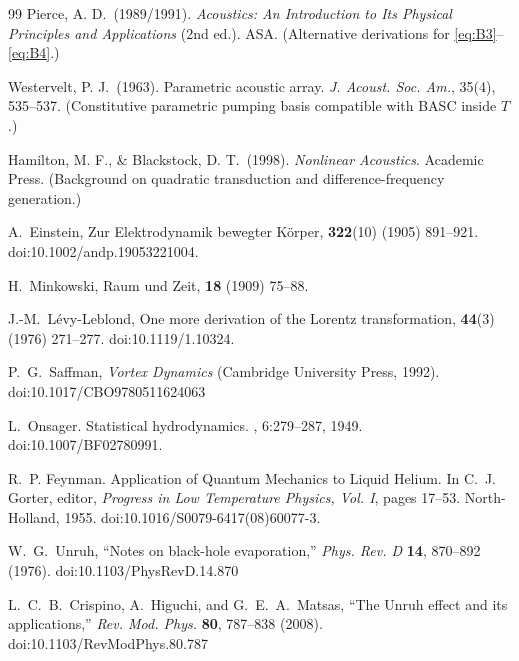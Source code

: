 \documentclass[10pt,reprint,aps,onecolumn,nofootinbib]{revtex4-2}
\begin{document}
\begin{thebibliography}{99}
    Pierce, A. D.\ (1989/1991).
    \emph{Acoustics: An Introduction to Its Physical Principles and Applications} (2nd ed.). ASA.
    (Alternative derivations for \eqref{eq:B3}–\eqref{eq:B4}.)

    Westervelt, P. J.\ (1963).
    Parametric acoustic array.
    \emph{J. Acoust. Soc. Am.}, 35(4), 535–537.
    (Constitutive parametric pumping basis compatible with BASC inside $T$.)

    Hamilton, M. F., \& Blackstock, D. T.\ (1998).
    \emph{Nonlinear Acoustics}. Academic Press.
    (Background on quadratic transduction and difference-frequency generation.)


    A.~Einstein,
    \newblock Zur Elektrodynamik bewegter K{\"o}rper,
     \textbf{322}(10) (1905) 891--921.
    \newblock doi:10.1002/andp.19053221004.

    H.~Minkowski,
    \newblock Raum und Zeit,
     \textbf{18} (1909) 75--88.

    J.-M.~L{\'e}vy-Leblond,
    \newblock One more derivation of the Lorentz transformation,
     \textbf{44}(3) (1976) 271--277.
    \newblock doi:10.1119/1.10324.

    P.~G.~Saffman,
    \emph{Vortex Dynamics}
    (Cambridge University Press, 1992).
    doi:10.1017/CBO9780511624063

    L.~Onsager.
    \newblock Statistical hydrodynamics.
    , 6:279--287, 1949.
    \newblock doi:10.1007/BF02780991.

    R.~P. Feynman.
    \newblock Application of Quantum Mechanics to Liquid Helium.
    \newblock In C.~J. Gorter, editor, {\em Progress in Low Temperature Physics, Vol. I}, pages 17--53. North-Holland, 1955.
    \newblock doi:10.1016/S0079-6417(08)60077-3.

    W.~G.~Unruh,
    ``Notes on black-hole evaporation,''
    \textit{Phys. Rev. D} \textbf{14}, 870--892 (1976).
    doi:10.1103/PhysRevD.14.870

    L.~C.~B.~Crispino, A.~Higuchi, and G.~E.~A.~Matsas,
    ``The Unruh effect and its applications,''
    \textit{Rev. Mod. Phys.} \textbf{80}, 787--838 (2008).
    doi:10.1103/RevModPhys.80.787


\end{thebibliography}
\end{document}
